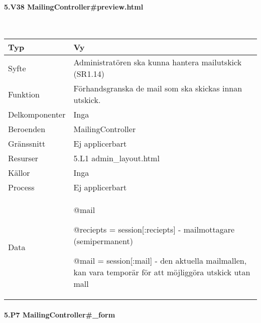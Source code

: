 \documentclass[a4paper, twoside, 11pt, titlepage]{article}
\begin{document}
			\paragraph{5.V38 MailingController\#preview.html}\

			\begin {table} [ht] \begin{tabular} {  p{3.5cm} p{9.6cm} }
				\hline
				{Typ} & {Vy} \\
				\hline
				{Syfte} & {Administratören ska kunna hantera mailutskick (SR1.14)} \\
				\hline
				{Funktion} & {Förhandsgranska de mail som ska skickas innan utskick.} \\
				\hline
				{Delkomponenter} & {Inga} \\
				\hline
				{Beroenden} & {MailingController} \\
				\hline
				{Gränssnitt} & {Ej applicerbart} \\
				\hline
				{Resurser} & {5.L1 admin\_layout.html} \\
				\hline
				{Källor} & {Inga} \\
				\hline
				{Process} & {Ej applicerbart} \\
				\hline
				{Data} & {@mail

@reciepts = session[:reciepts] - mailmottagare (semipermanent)

@mail = session[:mail] - den aktuella mailmallen, kan vara temporär för att möjliggöra utskick utan mall} \\
				\hline
			\end{tabular} \end{table} \FloatBarrier


			\paragraph{5.P7 MailingController\#\_form}\
\end{document}
